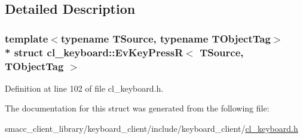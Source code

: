 \subsection{Detailed Description}
\subsubsection*{template$<$typename T\+Source, typename T\+Object\+Tag$>$\\*
struct cl\+\_\+keyboard\+::\+Ev\+Key\+Press\+R$<$ T\+Source, T\+Object\+Tag $>$}



Definition at line 102 of file cl\+\_\+keyboard.\+h.



The documentation for this struct was generated from the following file\+:\begin{DoxyCompactItemize}
\item 
smacc\+\_\+client\+\_\+library/keyboard\+\_\+client/include/keyboard\+\_\+client/\hyperlink{cl__keyboard_8h}{cl\+\_\+keyboard.\+h}\end{DoxyCompactItemize}
